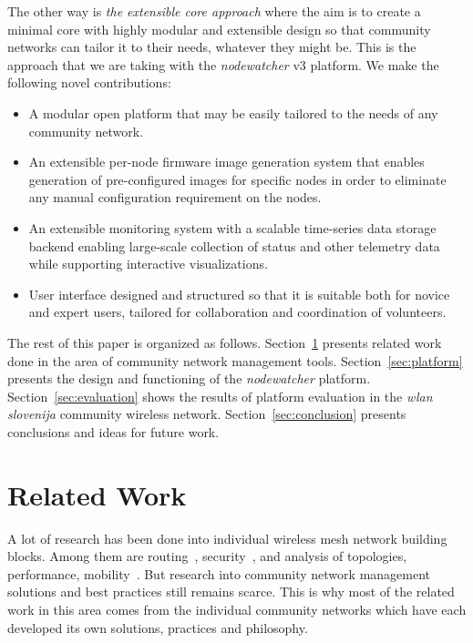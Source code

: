 \documentclass[5p,sort&compress]{elsarticle}
\newcommand{\nodewatcher}{\textit{nodewatcher}}
\newcommand{\wlanslovenija}{\textit{wlan slovenija}}
\begin{document}
The other way is \textit{the extensible core approach} where the aim is to create a minimal core with highly modular and extensible design so that community networks can tailor it to their needs, whatever they might be.
This is the approach that we are taking with the \nodewatcher{} v3 platform.
We make the following novel contributions:
\begin{itemize}
\item A modular open platform that may be easily tailored to the needs of any community network.
\item An extensible per-node firmware image generation system that enables generation of pre-configured images for specific nodes in order to eliminate any manual configuration requirement on the nodes.
\item An extensible monitoring system with a scalable time-series data storage backend enabling large-scale collection of status and other telemetry data while supporting interactive visualizations.
\item User interface designed and structured so that it is suitable both for novice and expert users, tailored for collaboration and coordination of volunteers.
\end{itemize}

The rest of this paper is organized as follows.
Section~\ref{sec:related-work} presents related work done in the area of community network management tools.
Section~\ref{sec:platform} presents the design and functioning of the \nodewatcher{} platform.
Section~\ref{sec:evaluation} shows the results of platform evaluation in the \wlanslovenija{} community wireless network.
Section~\ref{sec:conclusion} presents conclusions and ideas for future work.

\section{Related Work}
\label{sec:related-work}

A lot of research has been done into individual wireless mesh network building blocks. Among them are routing~\cite{Murray_2010,Neumann_2012}, security~\cite{Siddiqui_2007}, and analysis of topologies, performance, mobility~\cite{Vega_2012,Zakrzewska_2008}.
But research into community network management solutions and best practices still remains scarce.
This is why most of the related work in this area comes from the individual community networks which have each developed its own solutions, practices and philosophy.
\end{document}
